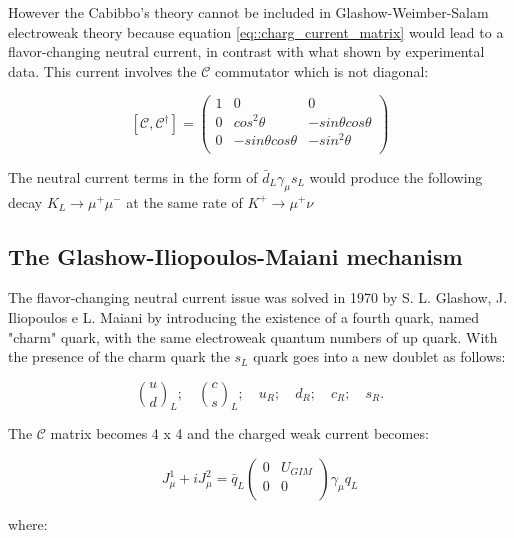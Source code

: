 However the Cabibbo's theory cannot be included in Glashow-Weimber-Salam electroweak theory because equation \ref{eq::charg_current_matrix} would lead to a flavor-changing neutral current, in contrast with what shown by experimental data. This current involves the $\mathcal{C}$ commutator which is not diagonal:

\begin{equation}
\left[\mathcal{C}, \mathcal{C}^{\dagger} \right]
=
\begin{pmatrix}
1 &0 &0 \\
0 &cos^{2}\theta &-sin\theta cos\theta \\
0 &-sin\theta cos\theta &-sin^{2}\theta\\
\end{pmatrix}
\end{equation}

The neutral current terms in the form of $\bar{d}_{L}\gamma_{\mu}s_{L}$ would produce the following decay $K_{L} \longrightarrow \mu^{+}\mu^{-}$ at the same rate of $K^{+} \longrightarrow \mu^{+}\nu$

\subsection{The Glashow-Iliopoulos-Maiani mechanism}

The flavor-changing neutral current issue was solved in 1970 by S. L. Glashow, J. Iliopoulos e L. Maiani \cite{Glashow:1970gm} by introducing the existence of a fourth quark, named "charm" quark, with the same electroweak quantum numbers of up quark. With the presence of the charm quark the $s_{L}$ quark goes into a new doublet as follows: 

\begin{equation}
\binom{u}{d}_{L}; \quad \binom{c}{s}_{L}; \quad u_{R}; \quad d_{R}; \quad c_{R}; \quad s_{R}.
\end{equation}

The $\mathcal{C}$ matrix becomes 4 x 4 and the charged weak current becomes:

\begin{equation}
J^{1}_{\mu} + i J^{2}_{\mu} = \bar{q}_{L} 
\begin{pmatrix}
0 &U_{GIM} \\
0 &0 \\
\end{pmatrix}
\gamma_{\mu}q_{L}
\label{eq::cab_current_gim}
\end{equation}

where:

